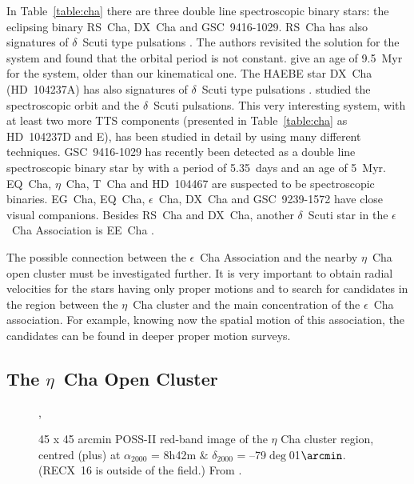 \documentclass[11pt,twoside]{book}
\begin{document}
In Table~\ref{table:cha} there are three double line spectroscopic
binary stars: the eclipsing binary RS~Cha, DX~Cha and GSC~9416-1029.
RS~Cha has also signatures of $\delta$~Scuti type pulsations
\citep{alecian05}.  The authors revisited the solution for the system
and found that the orbital period is not constant.  \citet{alecian07}
give an age of 9.5~Myr for the system, older than our kinematical one.
The HAEBE star DX~Cha (HD~104237A) has also signatures of
$\delta$~Scuti type pulsations \citep{kurtz99}.  \citet{bohm04}
studied the spectroscopic orbit and the $\delta$~Scuti pulsations.
This very interesting system, with at least two more TTS components
(presented in Table~\ref{table:cha} as HD~104237D and E), has been
studied in detail by \citet{grady04} using many different techniques.
GSC~9416-1029 has recently been detected as a double line
spectroscopic binary star by \citet{doppmann07} with a period of
5.35~days and an age of 5~Myr.  EQ~Cha, $\eta$~Cha, T~Cha and
HD~104467 are suspected to be spectroscopic binaries. EG~Cha, EQ~Cha,
$\epsilon$~Cha, DX~Cha and GSC~9239-1572 have close visual companions.
Besides RS~Cha and DX~Cha, another $\delta$~Scuti star in the
$\epsilon$~Cha Association is EE~Cha \citep{kurtz99}.

The possible connection between the $\epsilon$~Cha Association and the
nearby $\eta$~Cha open cluster must be investigated further.  It is
very important to obtain radial velocities for the stars having only
proper motions and to search for candidates in the region between the
$\eta$~Cha cluster and the main concentration of the $\epsilon$~Cha
association.  For example, knowing now the spatial motion of this
association, the candidates can be found in deeper proper motion
surveys.

\subsection{The $\eta$~Cha Open Cluster}

\begin{figure}[]
   \begin{center}
,
    \end{center}
\caption{ 45 x 45 arcmin POSS-II red-band image of the $\eta$ Cha cluster region,
centred (plus) at $\alpha_{2000}$ = 8h42m $\&\,\, \delta_{2000}$ = --79$\deg$01$\arcmin$.
(RECX~16 is outside of the field.) From \citet{lyo04}.}
\label{fig:eta}
\end{figure}
\end{document}

